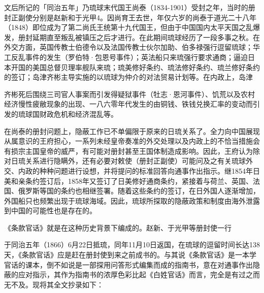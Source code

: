 文后所记的「同治五年」乃琉球末代国王尚泰（1834-1901）受封之年，当时的册封正副使分别是赵新和于光甲4。因尚育王去世，年仅六岁的尚泰于道光二十八年（1848）即位成为了第二尚氏王统第十九代国王，但由于中国国内太平天国之乱爆发，册封延期直至叛乱被镇压之后才进行。在此期间琉球经历了一段多事之秋。在外交方面，英国传教士伯德令以及法国传教士伙尔加助、伯多禄强行逗留琉球；华工反乱事件的发生（罗伯特·包恩号事件）；英法船只来琉强行要求通商；逼迫日本开国的美国总督贝理率舰队来琉；琉美修好条约、琉法修好条约、琉兰修好条约的签订；岛津齐彬主导实施的以琉球为仲介的对法贸易计划等。在内政上，岛津

\vfill
\begin{BookNotes}
\end{BookNotes}

\noindent 齐彬死后围绕三司官人事案而引发得疑狱事件（牡志·恩河事件）、饥荒以及农村经济慢性疲敝现象的出现、一八六零年代发生的由铜钱、铁钱兑换汇率的变动而引发的琉球国财政危机和经济混乱等。

在尚泰的册封问题上，隐蔽工作已不单偏限于原来的日琉关系了。全力向中国展现从属意识的王府担心，一系列未经皇帝奏准的外交处理以及内政上的不恰当措施会有损宗主国皇帝的威严，有可能对册封甚至王国体制造成影响。因此，王府认为除对日琉关系进行隐瞒外，还有必要对敕使（册封正副使）可能问及之有关琉球外交、内政的种种问题进行设想，并将提问的标准回答向通事作出指示。继1854年日美和亲条约签订后，1858年又签订了日美修好通商条约，紧接着与荷兰、英国、法国、俄罗斯等国的条约也相继签署。随着这些条约的签订，在日外国人逐渐增加，外国船只也频繁出现于琉球海域。因此，琉球所探取的隐蔽政策和制度由海外泄露到中国的可能性也是存在的。

\begin{BookQuote}
《条款官话》就是在这种历史背景下编成的。赵新、于光甲等册封使一行
\end{BookQuote}

于同治五年（1866）6月22日抵琉，同年11月10日返国，在琉球的逗留时间长达138天，《条款官话》应是赶在册封使到来之前成书的。与其说《条款官话》是一本学官话的课本，倒不如说是一部探用问答形式编集而成的指南书，意在对通事作出隐蔽的应对指示，其作为指南书的浓厚色彩比起《白姓官话》而言，完全是有过之而无不及。现将其全文抄录如下：

